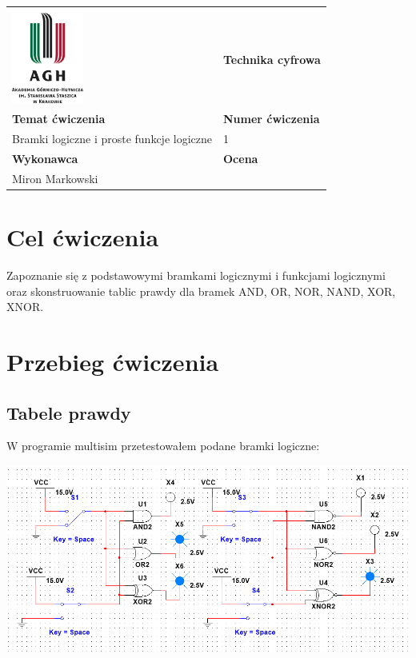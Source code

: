 \documentclass[12pt,a4paper]{article}
\begin{document}
\begin{table}[]
\label{my-label}
\begin{tabular}{|p{7.5cm}|p{7.5cm}|}
\hline
									           					&                           \\
\includegraphics[height=3cm]{logo}             					& \textbf{Technika cyfrowa} \\ \hline
\multicolumn{1}{|l|}{\textbf{Temat ćwiczenia}} 					& \textbf{Numer ćwiczenia}  \\
\multicolumn{1}{|l|}{Bramki logiczne i proste funkcje logiczne}	& 1                         \\ \hline
\multicolumn{1}{|l|}{\textbf{Wykonawca}}       & \textbf{Ocena}            \\
\multicolumn{1}{|l|}{Miron Markowski}          &                           \\ \hline
\end{tabular}
\end{table}

\section{Cel ćwiczenia}

Zapoznanie się z podstawowymi bramkami logicznymi i funkcjami logicznymi oraz skonstruowanie tablic prawdy dla bramek AND, OR, NOR, NAND, XOR, XNOR.



\section{Przebieg ćwiczenia}

\subsection{Tabele prawdy}
W programie multisim przetestowałem podane bramki logiczne:

\begin{center}
\includegraphics[width=.7\textwidth]{tabela}
\end{center}
\end{document}
